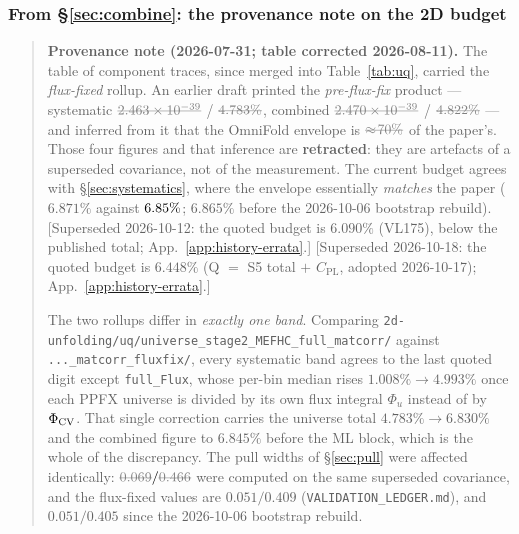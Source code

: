 \subsubsection{From \S\ref{sec:combine}: the provenance note on the 2D budget}
\label{app:history-combine}
\begin{quote}
\textbf{Provenance note (2026-07-31; table corrected 2026-08-11).} The table of component traces, since merged into Table~\ref{tab:uq}, carried the \emph{flux-fixed} rollup. An earlier draft printed the \emph{pre-flux-fix} product --- systematic $\dead{2.463\times10^{-39}}$ / $\dead{4.783\%}$, combined $\dead{2.470\times10^{-39}}$ / $\dead{4.822\%}$ --- and inferred from it that the OmniFold envelope is $\dead{\approx\!70\%}$ of the paper's. Those four figures and that inference are \textbf{retracted}: they are artefacts of a superseded covariance, not of the measurement. The current budget agrees with \S\ref{sec:systematics}, where the envelope essentially \emph{matches} the paper ($6.871\%$ against $6.85\%$; $6.865\%$ before the 2026-10-06 bootstrap rebuild). [Superseded 2026-10-12: the quoted budget is $6.090\%$ (VL175), below the published total; App.~\ref{app:history-errata}.] [Superseded 2026-10-18: the quoted budget is $6.448\%$ (Q $=$ S5 total $+$ $C_{\mathrm{PL}}$, adopted 2026-10-17); App.~\ref{app:history-errata}.]

The two rollups differ in \emph{exactly one band}. Comparing \texttt{2d-unfolding/uq/universe\_stage2\_MEFHC\_full\_matcorr/} against \texttt{...\_matcorr\_fluxfix/}, every systematic band agrees to the last quoted digit except \texttt{full\_Flux}, whose per-bin median rises $1.008\% \rightarrow 4.993\%$ once each PPFX universe is divided by its own flux integral $\Phi_u$ instead of by $\Phi_{\rm CV}$. That single correction carries the universe total $4.783\% \rightarrow 6.830\%$ and the combined figure to $6.845\%$ before the ML block, which is the whole of the discrepancy. The pull widths of \S\ref{sec:pull} were affected identically: $\dead{0.069}/\dead{0.466}$ were computed on the same superseded covariance, and the flux-fixed values are $0.051/0.409$ (\texttt{VALIDATION\_LEDGER.md}), and $0.051/0.405$ since the 2026-10-06 bootstrap rebuild.


\end{quote}
